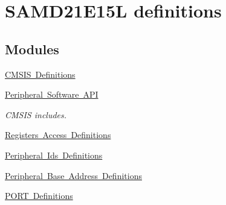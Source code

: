 \hypertarget{group___s_a_m_d21_e15_l__definitions}{}\section{S\+A\+M\+D21\+E15L definitions}
\label{group___s_a_m_d21_e15_l__definitions}
\subsection*{Modules}
\begin{DoxyCompactItemize}
\item 
\mbox{\hyperlink{group___s_a_m_d21_e15_l__cmsis}{C\+M\+S\+I\+S Definitions}}
\item 
\mbox{\hyperlink{group___s_a_m_d21_e15_l__api}{Peripheral Software A\+PI}}
\begin{DoxyCompactList}\small\item\em C\+M\+S\+IS includes. \end{DoxyCompactList}\item 
\mbox{\hyperlink{group___s_a_m_d21_e15_l__reg}{Registers Access Definitions}}
\item 
\mbox{\hyperlink{group___s_a_m_d21_e15_l__id}{Peripheral Ids Definitions}}
\item 
\mbox{\hyperlink{group___s_a_m_d21_e15_l__base}{Peripheral Base Address Definitions}}
\item 
\mbox{\hyperlink{group___s_a_m_d21_e15_l__port}{P\+O\+R\+T Definitions}}
\end{DoxyCompactItemize}
